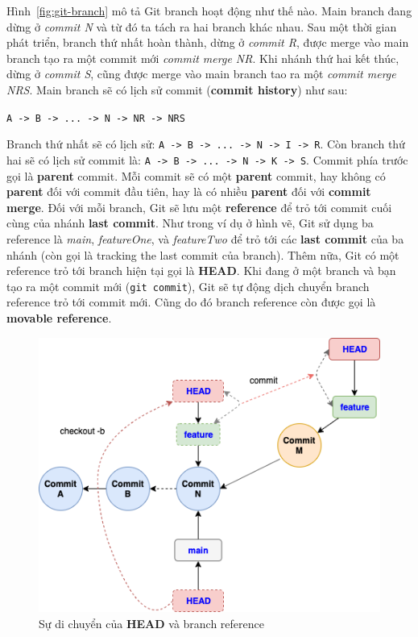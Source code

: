 \documentclass[a4paper, 11pt]{article}
\begin{document}
Hình~\ref{fig:git-branch} mô tả Git branch hoạt động như thế nào. Main branch đang dừng ở \textit{commit N} và từ đó ta tách ra hai branch khác nhau. Sau một thời gian phát triển, branch thứ nhất hoàn thành, dừng ở \textit{commit R}, được merge vào main branch tạo ra một commit mới \textit{commit merge NR}. Khi nhánh thứ hai kết thúc, dừng ở \textit{commit S}, cũng được merge vào main branch tao ra một \textit{commit merge NRS}. Main branch sẽ có lịch sử commit (\textbf{commit history}) như sau:

\texttt{A -> B -> ... -> N -> NR -> NRS}

\noindent Branch thứ nhất sẽ có lịch sử: \texttt{A -> B -> ... -> N -> I -> R}. Còn branch thứ hai sẽ có lịch sử commit là:  \texttt{A -> B -> ... -> N -> K -> S}. Commit phía trước gọi là \textbf{parent} commit. Mỗi commit sẽ có một \textbf{parent} commit, hay không có \textbf{parent} đối với commit đầu tiên, hay là có nhiều \textbf{parent} đối với \textbf{commit merge}. Đối với mỗi branch, Git sẽ lưu một \textbf{reference} để trỏ tới commit cuối cùng của nhánh \textbf{last commit}. Như trong ví dụ ở hình vẽ, Git sử dụng ba reference là \textit{main}, \textit{featureOne}, và \textit{featureTwo} để trỏ tới các \textbf{last commit} của ba nhánh (còn gọi là tracking the last commit của branch). Thêm nữa, Git có một reference trỏ tới branch hiện tại gọi là \textbf{HEAD}. Khi đang ở một branch và bạn tạo ra một commit mới (\texttt{git commit}), Git sẽ tự động dịch chuyển branch reference trỏ tới commit mới. Cũng do đó branch reference còn được gọi là \textbf{movable reference}.

\begin{figure}
\centering
\includegraphics[scale=0.6]{git-reference-move.png}
\caption{Sự di chuyển của \textbf{HEAD} và branch reference}
\label{fig:reference-movation}
\end{figure}
\end{document}

